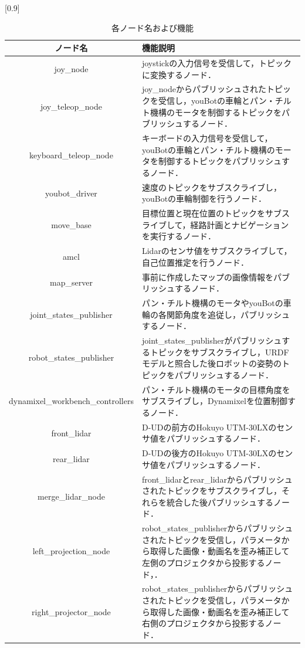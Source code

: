 \documentclass[12pt]{sonota/aislab}
\begin{document}
\begin{table}[t]
\begin{center}
\caption{各ノード名および機能}
\label{table:ros_node}
\scalebox{0.9}[0.9]{
  \begin{tabular}{|c|p{10cm}|}\hline
   ノード名 & 機能説明 \\\hline
   joy\_node & joystickの入力信号を受信して，トピックに変換するノード． \\ \hline
   joy\_teleop\_node & joy\_nodeからパブリッシュされたトピックを受信し，youBotの車輪とパン・チルト機構のモータを制御するトピックをパブリッシュするノード． \\ \hline
   keyboard\_teleop\_node & キーボードの入力信号を受信して，youBotの車輪とパン・チルト機構のモータを制御するトピックをパブリッシュするノード． \\ \hline
   youbot\_driver & 速度のトピックをサブスクライブし，youBotの車輪制御を行うノード． \\ \hline
   move\_base & 目標位置と現在位置のトピックをサブスライブして，経路計画とナビゲーションを実行するノード． \\ \hline
   amcl & Lidarのセンサ値をサブスクライブして，自己位置推定を行うノード． \\ \hline
   map\_server & 事前に作成したマップの画像情報をパブリッシュするノード． \\ \hline
   joint\_states\_publisher & パン・チルト機構のモータやyouBotの車輪の各関節角度を追従し，パブリッシュするノード． \\ \hline
   robot\_states\_publisher & joint\_states\_publisherがパブリッシュするトピックをサブスクライブし，URDFモデルと照合した後ロボットの姿勢のトピックをパブリッシュするノード． \\ \hline
   dynamixel\_workbench\_controllers & パン・チルト機構のモータの目標角度をサブスライブし，Dynamixelを位置制御するノード． \\ \hline
   front\_lidar & D-UDの前方のHokuyo UTM-30LXのセンサ値をパブリッシュするノード． \\ \hline
   rear\_lidar & D-UDの後方のHokuyo UTM-30LXのセンサ値をパブリッシュするノード． \\ \hline
   merge\_lidar\_node & front\_lidarとrear\_lidarからパブリッシュされたトピックをサブスクライブし，それらを統合した後パブリッシュするノード． \\ \hline
   left\_projection\_node & robot\_states\_publisherからパブリッシュされたトピックを受信し，パラメータから取得した画像・動画名を歪み補正して左側のプロジェクタから投影するノード，． \\ \hline
   right\_projector\_node & robot\_states\_publisherからパブリッシュされたトピックを受信し，パラメータから取得した画像・動画名を歪み補正して右側のプロジェクタから投影するノード． \\ \hline

  \end{tabular}
}
  \end{center}
\end{table}
\end{document}
